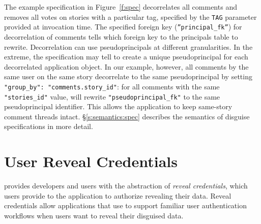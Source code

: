 The example specification in Figure~\ref{f:spec} decorrelates all comments and
removes all votes on stories with a particular tag, specified by the
\texttt{TAG} parameter provided at invocation time.  The specified foreign key
(\texttt{''principal\_fk''}) for decorrelation of comments tells \sys which
foreign key to the principals table to rewrite. 
%
Decorrelation can use pseudoprincipals at different granularities.  In the
extreme, the \xx specification may tell \sys to create a unique pseudoprincipal
for each decorrelated application object.  In our example, however, all comments
by the same user on the same story decorrelate to the same pseudoprincipal by
setting \verb+"group_by": "comments.story_id"+: for all comments with the same
\texttt{"stories\_id"} value, \sys will rewrite \texttt{"pseudoprincipal\_fk"}
to the same pseudoprincipal identifier.  This allows the application to keep
same-story comment threads intact.
%
\S\ref{s:semantics:spec} describes the semantics of disguise specifications in more
detail.
%
%

\section{User Reveal Credentials}
\sys provides developers and users with the abstraction of \emph{reveal
credentials}, which users provide to the application to authorize revealing
their data.
%
Reveal credentials allow applications that use \sys to support familiar user
authentication workflows when users want to reveal their disguised data. 
%

